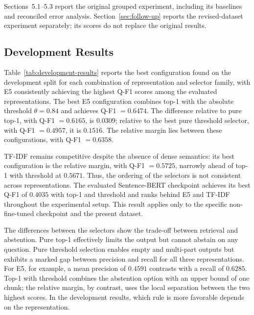 \documentclass[11pt]{article}
\newcommand{\revision}[1]{#1}
\begin{document}
\revision{Sections~5.1--5.3 report the original grouped experiment, including its baselines and reconciled error analysis. Section~\ref{sec:follow-up} reports the revised-dataset experiment separately; its scores do not replace the original results.}

\subsection{Development Results}

Table~\ref{tab:development-results} reports the best configuration found on the development split for each combination of representation and selector family, with E5 consistently achieving the highest Q-F1 scores among the evaluated representations. The best E5 configuration combines top-1 with the absolute threshold $\theta=0.84$ and achieves Q-F1 $=0.6474$. The difference relative to pure top-1, with Q-F1 $=0.6165$, is $0.0309$; relative to the best pure threshold selector, with Q-F1 $=0.4957$, it is $0.1516$. The relative margin lies between these configurations, with Q-F1 $=0.6358$.

TF-IDF remains competitive despite the absence of dense semantics: its best configuration is the relative margin, with Q-F1 $=0.5725$, narrowly ahead of top-1 with threshold at $0.5671$. Thus, the ordering of the selectors is not consistent across representations. The evaluated Sentence-BERT checkpoint achieves its best Q-F1 of $0.4035$ with top-1 and threshold and ranks behind E5 and TF-IDF throughout the experimental setup. This result applies only to the specific non-fine-tuned checkpoint and the present dataset.

The differences between the selectors show the trade-off between retrieval and abstention. Pure top-1 effectively limits the output but cannot abstain on any question. Pure threshold selection enables empty and multi-part outputs but exhibits a marked gap between precision and recall for all three representations. For E5, for example, a mean precision of $0.4591$ contrasts with a recall of $0.6285$. Top-1 with threshold combines the abstention option with an upper bound of one chunk; the relative margin, by contrast, uses the local separation between the two highest scores. In the development results, which rule is more favorable depends on the representation.
\end{document}
